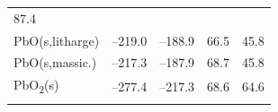\documentclass[
  9pt,
]{extbook}
\theoremstyle{definition}
\theoremstyle{definition}
\theoremstyle{definition}
\theoremstyle{remark}
\begin{document}
\begin{longtable}[]{@{}lllll@{}}
\begin{minipage}[t]{0.18\columnwidth}
87.4\strut
\end{minipage}\tabularnewline
\begin{minipage}[t]{0.10\columnwidth}\raggedright
PbO(s,litharge)\strut
\end{minipage} & \begin{minipage}[t]{0.19\columnwidth}\raggedright
--219.0\strut
\end{minipage} & \begin{minipage}[t]{0.20\columnwidth}\raggedright
--188.9\strut
\end{minipage} & \begin{minipage}[t]{0.18\columnwidth}\raggedright
66.5\strut
\end{minipage} & \begin{minipage}[t]{0.18\columnwidth}\raggedright
45.8\strut
\end{minipage}\tabularnewline
\begin{minipage}[t]{0.10\columnwidth}\raggedright
PbO(s,massic.)\strut
\end{minipage} & \begin{minipage}[t]{0.19\columnwidth}\raggedright
--217.3\strut
\end{minipage} & \begin{minipage}[t]{0.20\columnwidth}\raggedright
--187.9\strut
\end{minipage} & \begin{minipage}[t]{0.18\columnwidth}\raggedright
68.7\strut
\end{minipage} & \begin{minipage}[t]{0.18\columnwidth}\raggedright
45.8\strut
\end{minipage}\tabularnewline
\begin{minipage}[t]{0.10\columnwidth}\raggedright
PbO\textsubscript{2}(s)\strut
\end{minipage} & \begin{minipage}[t]{0.19\columnwidth}\raggedright
--277.4\strut
\end{minipage} & \begin{minipage}[t]{0.20\columnwidth}\raggedright
--217.3\strut
\end{minipage} & \begin{minipage}[t]{0.18\columnwidth}\raggedright
68.6\strut
\end{minipage} & \begin{minipage}[t]{0.18\columnwidth}\raggedright
64.6\strut
\end{minipage}\tabularnewline
\begin{minipage}[t]{0.10\columnwidth}\raggedright

\end{minipage}
\end{longtable}
\end{document}
